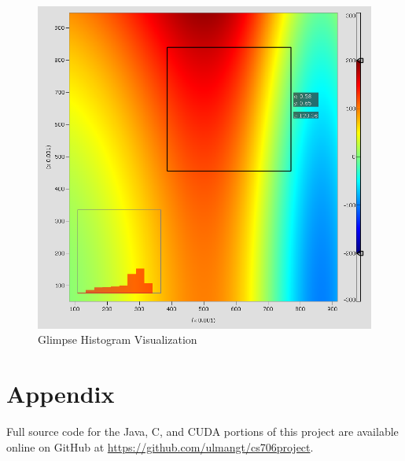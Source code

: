 \documentclass{article}
\begin{document}
\begin{figure}
\centering
\includegraphics[width=1.0\textwidth]{screenshots/glimpse/GlimpseHistogramPlot.png}
\caption{Glimpse Histogram Visualization}
\label{histogram1}
\end{figure}

\section{Appendix}\label{appendix}

Full source code for the Java, C, and CUDA portions of this project are available online on GitHub at \url{https://github.com/ulmangt/cs706project}.



\end{document}
